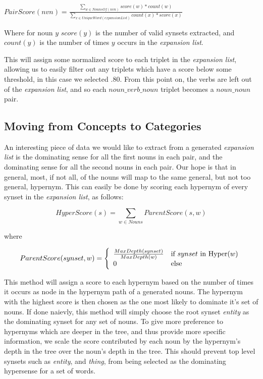 \documentclass[11pt]{article}
\begin{document}
\small
$ PairScore(nvn) = \frac {\displaystyle\sum_{w \in NounsOf(nvn)} {score(w) * count(w)}}
                          {\displaystyle\sum_{x \in UniqueWord(expansionList)}
                          {count(x)} * score(x)} $ 
\normalsize

Where for noun $y$ $score(y)$ is the number of valid synsets extracted, and $count(y)$ is the
number of times $y$ occurs in the \emph{expansion list}.

This will assign some normalized score to each triplet in the \emph{expansion
list},
allowing us to easily filter out any triplets which have a score below some
threshold, in this case we selected \(.80\).  From this point on, the verbs are
left out of the \emph{expansion list}, and so each $noun\_verb\_noun$ triplet becomes a
$noun\_noun$ pair.

\subsection{Moving from Concepts to Categories}

An interesting piece of data we would like to extract from a generated
\emph{expansion list} is the dominating sense for all the first nouns in each
pair, and the dominating sense for all the second nouns in each pair.  Our hope
is that in general, most, if not all, of the nouns will map to the same general, but
not too general, hypernym.  This can easily be done by scoring each hypernym of
every synset in the \emph{expansion list}, as follows:

\small
\[ HyperScore(s) = \displaystyle\sum_{w \in Nouns} ParentScore(s, w) 
\]

\normalsize
where

\small
\[ ParentScore(synset, w) = \left\{ 
 \begin{array}{l l}
   {\frac {MaxDepth(synset)} {MaxDepth(w)}} & \mbox{if $synset$ in Hyper($w$)}\\
   0 & \mbox{else}\\
 \end{array} \right.
\]

\normalsize
This method will assign a score to each hypernym based on the number of times it
occurs as node in the hypernym path of a generated nouns.  The hypernym with the
highest score is then chosen as the one most likely to dominate it's set of nouns.
If done naievly, this method will simply choose the root synset \emph{entity} as
the dominating synset for any set of nouns.  To give more preference
to hypernyms which are deeper in the tree, and thus provide more specific
information, we scale the score contributed by each noun by the hypernym's
depth in the tree over the noun's depth in the tree.  This should prevent top
level synsets such as \emph{entity}, and \emph{thing}, from being selected as 
the dominating hypersense for a set of words.  
\end{document}
